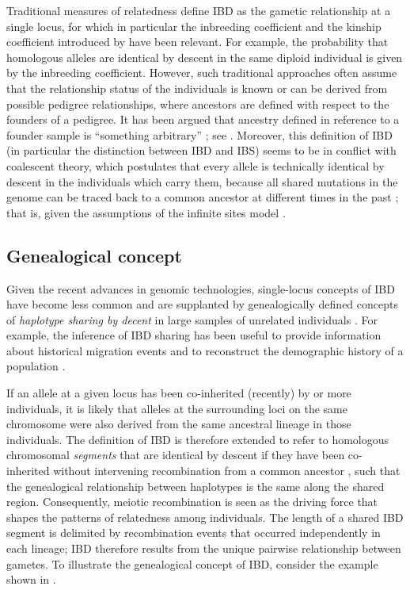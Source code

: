 Traditional measures of relatedness define IBD as the gametic relationship at a single locus, for which in particular the inbreeding coefficient and the kinship coefficient introduced by \citet{Wright:1921tk,Wright:1922cr} have been relevant.
For example, the probability that  homologous alleles are identical by descent in the same diploid individual is given by the inbreeding coefficient.
However, such traditional approaches often assume that the relationship status of the individuals is known or can be derived from possible pedigree relationships, where ancestors are defined with respect to the founders of a pedigree.
It has been argued that ancestry defined in reference to a founder sample is ``something arbitrary'' \citep[][p~141]{maynardsmith1989}; see \citet{Rousset:2002bz}.
Moreover, this definition of IBD (in particular the distinction between IBD and IBS) seems to be in conflict with coalescent theory, which postulates that every allele is technically identical by descent in the individuals which carry them, because all shared mutations in the genome can be traced back to a common ancestor at different times in the past \citep{Powell:2010di}; that is, given the assumptions of the infinite sites model \citep{Kimura:1969tn,Watterson:1975ur}.

%
\subsection{Genealogical concept}
\label{sec:genealogical_ibd}
%

Given the recent advances in genomic technologies, single-locus concepts of IBD have become less common and are supplanted by genealogically defined concepts of \emph{haplotype sharing by decent} in large samples of unrelated individuals \citep{Thompson:2013cj,Wakeley2016book}.
For example, the inference of IBD sharing has been useful to provide information about historical migration events and to reconstruct the demographic history of a population \citep{Palamara:2012cya,Palamara:2013eg,Harris:2013id}.

%

%

If an allele at a given locus has been co-inherited (recently) by  or more individuals, it is likely that alleles at the surrounding loci on the same chromosome were also derived from the same ancestral lineage in those individuals.
The definition of IBD is therefore extended to refer to homologous chromosomal \emph{segments} that are identical by descent if they have been co-inherited without intervening recombination from a common ancestor \citep{Hayes:2003gj,Powell:2010di}, such that the genealogical relationship between  haplotypes is the same along the shared region.
Consequently, meiotic recombination is seen as the driving force that shapes the patterns of relatedness among individuals.
The length of a shared IBD segment is delimited by recombination events that occurred independently in each lineage; IBD therefore results from the unique pairwise relationship between  gametes.
To illustrate the genealogical concept of IBD, consider the example shown in .

